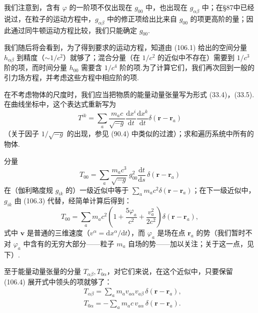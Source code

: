 我们注意到，含有 $\varphi$ 的一阶项不仅出现在 $g_{00}$ 中，也出现在 $g_{\alpha\beta}$ 中；在§87中已经说过，在粒子的运动方程中，$g_{\alpha\beta}$ 中的修正项给出比来自 $g_{00}$ 的项更高阶的量；因此通过同牛顿运动方程比较，我们只能确定 $g_{00}$.

我们随后将会看到，为了得到要求的运动方程，知道由 (106.1) 给出的空间分量 $h_{\alpha\beta}$ 到精度（$\sim1/c^{2}$）就够了；混合分量（在 $1/c^{2}$ 的近似中不存在）需要到 $1/c^{3}$ 阶的项，而时间分量 $h_{00}$ 需要含 $1/c^{4}$ 阶的项.为了计算它们，我们再次回到一般的引力场方程，并考虑这些方程中相应阶的项.

在不考虑物体的尺度时，我们应当把物质的能量动量张量写为形式 (33.4)，(33.5).在曲线坐标中，这个表达式重新写为
\begin{equation}
  T^{ik}=\sum_a\frac{m_ac}{\sqrt{-g}}
  \frac{\mathrm{d}x^{i}}{\mathrm{d}t}
  \frac{\mathrm{d}x^{k}}{\mathrm{d}t}
  \delta(\boldsymbol{r}-\boldsymbol{r}_a)
\end{equation}
（关于因子 $1/\sqrt{-g}$ 的出现，参见 (90.4) 中类似的过渡）；求和遍历系统中所有的物体.

分量
\begin{equation*}
  T_{00}=\sum_a\frac{m_ac^{3}}{\sqrt{-g}}\,g_{00}^{2}
  \frac{\mathrm{d}t}{\mathrm{d}s}\,\delta(\boldsymbol{r}-\boldsymbol{r}_a)
\end{equation*}
在（伽利略度规 $g_{ik}$ 的）一级近似中等于 $\sum_a m_ac^{2}\delta(\boldsymbol{r}-\boldsymbol{r}_a)$；在下一级近似中，$g_{ik}$ 由 (106.3) 代替，经简单计算后得到：
\begin{equation}
  T_{00}=\sum_a m_ac^{2}\left(1+\frac{5\varphi_a}{c^{2}}
  +\frac{v_a^{2}}{2c^{2}}\right)\delta(\boldsymbol{r}-\boldsymbol{r}_a),
\end{equation}
式中 $\boldsymbol{v}$ 是普通的三维速度（$v^{\alpha}=\mathrm{d}x^{\alpha}/\mathrm{d}t$），而 $\varphi_a$ 是场在点 $\boldsymbol{r}_a$ 的势（我们暂时不对 $\varphi_a$ 中含有的无穷大部分——粒子 $m_a$ 自场的势——加以关注；关于这一点，见下）.

至于能量动量张量的分量 $T_{\alpha\beta},T_{0\alpha}$，对它们来说，在这个近似中，只要保留 (106.4) 展开式中领头的项就够了：
\begin{equation}
\begin{aligned}
  &T_{\alpha\beta}
  =\sum_a m_a v_{a\alpha}v_{a\beta}\,\delta(\boldsymbol{r}-\boldsymbol{r}_a),\\
  &T_{0\alpha}=-\sum_a m_ac\,v_{a\alpha}\,\delta(\boldsymbol{r}-\boldsymbol{r}_a).
\end{aligned}
\end{equation}

